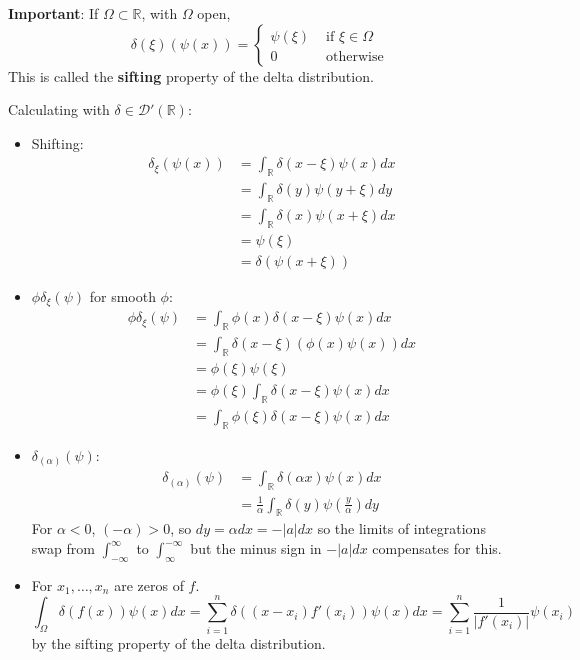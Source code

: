 \begin{remark}
	\textbf{Important}: If $\Omega \subset \mathbb{R}$, with $\Omega$ open,
	\[
		\delta(\xi) (\psi(x)) = \begin{cases}
			\psi(\xi) & \text{ if } \xi \in \Omega \\
			0 & \text{ otherwise}
		\end{cases}
	\]
	This is called the \textbf{sifting} property of the delta distribution.
\end{remark}

\begin{example}
	Calculating with $\delta \in \mathcal{D}'(\mathbb{R})$:
	\begin{itemize}
		\item Shifting:
		\[
			\begin{aligned}
				\delta_{\xi} (\psi(x))
					& = \int_\mathbb{R} \delta(x - \xi) \psi(x) dx \\
					& = \int_{\mathbb{R}} \delta(y) \psi(y + \xi) dy \\
					& = \int_{\mathbb{R}} \delta(x) \psi(x + \xi) dx \\
					& = \psi(\xi) \\
					& = \delta(\psi(x + \xi))
			\end{aligned}
		\]
		\item $\phi \delta_{\xi} (\psi)$ for smooth $\phi$:
		\[
			\begin{aligned}
				\phi \delta_{\xi} (\psi)
					& = \int_{\mathbb{R}} \phi(x) \delta(x - \xi) \psi(x) dx \\
					& = \int_{\mathbb{R}} \delta(x - \xi) (\phi(x) \psi(x)) dx \\
					& = \phi(\xi) \psi(\xi) \\
					& = \phi(\xi) \int_{\mathbb{R}} \delta(x - \xi) \psi(x) dx \\
					& = \int_{\mathbb{R}} \phi(\xi) \delta(x - \xi) \psi(x) dx
			\end{aligned}
		\]
		\item $\delta_{(\alpha)} (\psi)$:
		\[
			\begin{aligned}
				\delta_{(\alpha)} (\psi)
					& = \int_{\mathbb{R}} \delta(\alpha x) \psi(x) dx \\
					& = \frac{1}{\alpha} \int_{\mathbb{R}} \delta(y) \psi \left( \frac{y}{\alpha} \right) dy
			\end{aligned}
		\]
		For $\alpha < 0$, $(-\alpha) > 0$, so $dy = \alpha dx = -|a| dx$ so the limits of integrations swap from $\int_{-\infty}^{\infty}$ to $\int_{\infty}^{-\infty}$ but the minus sign in $-|a| dx$ compensates for this.
		\item For $x_1, \dots, x_n$ are zeros of $f$.
		\[
			\int_{\Omega} \delta(f(x)) \psi(x) dx = \sum_{i = 1}^{n} \delta((x - x_i) f'(x_i)) \psi(x) dx = \sum_{i = 1}^{n} \frac{1}{|f'(x_i)|} \psi(x_i)
		\]
		by the sifting property of the delta distribution.
	\end{itemize}
\end{example}

